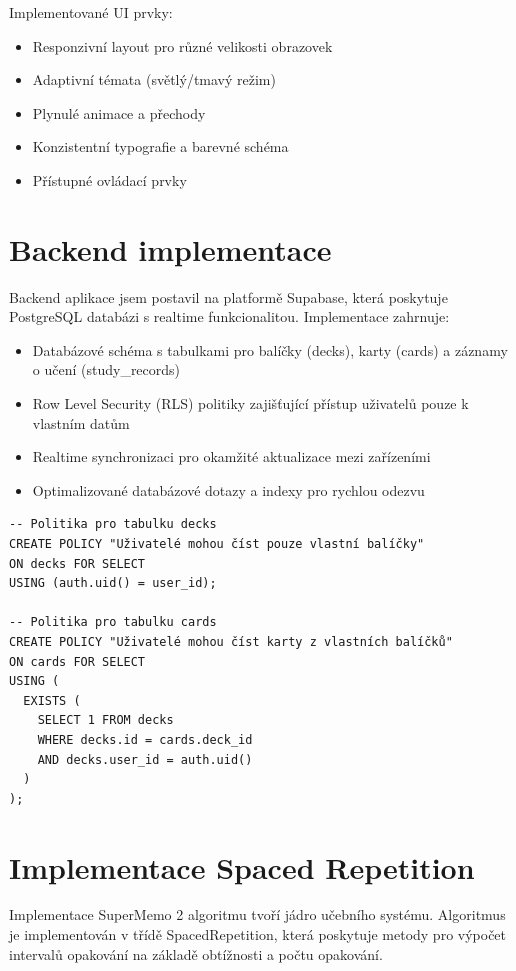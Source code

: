 \documentclass[12pt, a4paper, twoside, openright]{report}
\begin{document}
	Implementované UI prvky:
	\begin{itemize}
		\item Responzivní layout pro různé velikosti obrazovek
		\item Adaptivní témata (světlý/tmavý režim)
		\item Plynulé animace a přechody
		\item Konzistentní typografie a barevné schéma
		\item Přístupné ovládací prvky
	\end{itemize}

	\section{Backend implementace}
	Backend aplikace jsem postavil na platformě Supabase, která poskytuje PostgreSQL databázi s realtime funkcionalitou. Implementace zahrnuje:

	\begin{itemize}
		\item Databázové schéma s tabulkami pro balíčky (decks), karty (cards) a záznamy o učení (study\_records)
		\item Row Level Security (RLS) politiky zajišťující přístup uživatelů pouze k vlastním datům
		\item Realtime synchronizaci pro okamžité aktualizace mezi zařízeními
		\item Optimalizované databázové dotazy a indexy pro rychlou odezvu
	\end{itemize}

	\begin{lstlisting}[style=Python, caption=Ukázka RLS politik]
-- Politika pro tabulku decks
CREATE POLICY "Uživatelé mohou číst pouze vlastní balíčky"
ON decks FOR SELECT
USING (auth.uid() = user_id);

-- Politika pro tabulku cards
CREATE POLICY "Uživatelé mohou číst karty z vlastních balíčků"
ON cards FOR SELECT
USING (
  EXISTS (
    SELECT 1 FROM decks
    WHERE decks.id = cards.deck_id
    AND decks.user_id = auth.uid()
  )
);
	\end{lstlisting}

	\section{Implementace Spaced Repetition}
	Implementace SuperMemo 2 algoritmu tvoří jádro učebního systému. Algoritmus je implementován v třídě SpacedRepetition, která poskytuje metody pro výpočet intervalů opakování na základě obtížnosti a počtu opakování.
\end{document}
